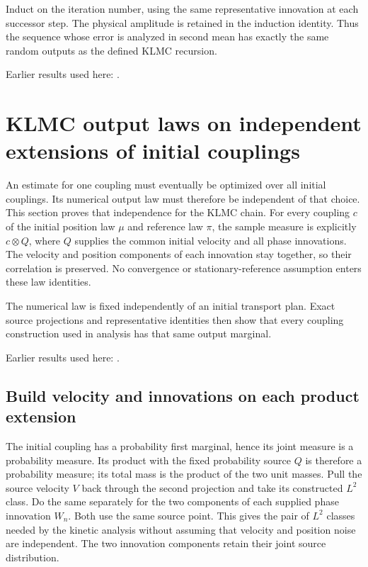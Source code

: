 \documentclass[11pt,a4paper]{report}
\begin{document}
Induct on the iteration number, using the same representative innovation at each successor step. The physical amplitude is retained in the induction identity. Thus the sequence whose error is analyzed in second mean has exactly the same random outputs as the defined KLMC recursion.



Earlier results used here: \cite[Section~3.13.2]{LangevinLean2026ULASC}.
\section{\texorpdfstring{KLMC output laws on independent extensions of initial couplings}{KLMC output laws on independent extensions of initial couplings}}
\label{proof-module-KineticLangevin-ProductLaw-lean}


An estimate for one coupling must eventually be optimized over all initial couplings. Its numerical output law must therefore be independent of that choice. This section proves that independence for the KLMC chain. For every coupling \(c\) of the initial position law \(\mu\) and reference law \(\pi\), the sample measure is explicitly \(c\otimes Q\), where \(Q\) supplies the common initial velocity and all phase innovations. The velocity and position components of each innovation stay together, so their correlation is preserved. No convergence or stationary-reference assumption enters these law identities.



The numerical law is fixed independently of an initial transport plan. Exact source projections and representative identities then show that every coupling construction used in analysis has that same output marginal.



Earlier results used here: \cite[Section~3.23]{LangevinLean2026ULASC}.
\subsection{\texorpdfstring{Build velocity and innovations on each product extension}{Build velocity and innovations on each product extension}}
\label{report-step-KineticLangevin-ProductLaw-lean-1}


The initial coupling has a probability first marginal, hence its joint measure is a probability measure. Its product with the fixed probability source \(Q\) is therefore a probability measure; its total mass is the product of the two unit masses. Pull the source velocity \(V\) back through the second projection and take its constructed \(L^{2}\) class. Do the same separately for the two components of each supplied phase innovation \(W_n\). Both use the same source point. This gives the pair of \(L^{2}\) classes needed by the kinetic analysis without assuming that velocity and position noise are independent. The two innovation components retain their joint source distribution.
\end{document}
